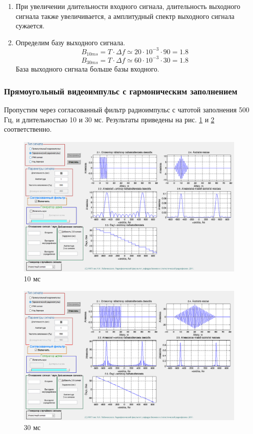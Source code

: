 \begin{enumerate}
    \item При увеличении длительности входного сигнала, длительность выходного сигнала также увеличивается, а
    амплитудный спектр выходного сигнала сужается.
    \item Определим базу выходного сигнала. 
    \begin{equation}
        B_{10ms} = T \cdot \Delta f \simeq 20 \cdot 10^{-3} \cdot 90 = 1.8
    \end{equation}
    \begin{equation}
        B_{30ms} = T \cdot \Delta f \simeq 60 \cdot 10^{-3} \cdot 30 = 1.8
    \end{equation}
    База выходного сигнала больше базы входного.
\end{enumerate}


\subsubsection{Прямоугольный видеоимпульс с гармоническим заполнением}
Пропустим через согласованный фильтр радиоимпульс с чатотой заполнения 500 Гц, и длительностью 10 и 30 мс. Результаты
приведены на рис. \ref{fig:task_2_2_10} и \ref{fig:task_2_2_30} соответственно.
\begin{figure}[H]
    \centering
    \includegraphics[width=0.9\linewidth]{imgs/task_2/t2s2_10.png}
    \caption{10 мс}
    \label{fig:task_2_2_10}
\end{figure}
\begin{figure}[H]
    \centering
    \includegraphics[width=0.9\linewidth]{imgs/task_2/t2s2_30.png}
    \caption{30 мс}
    \label{fig:task_2_2_30}
\end{figure}


